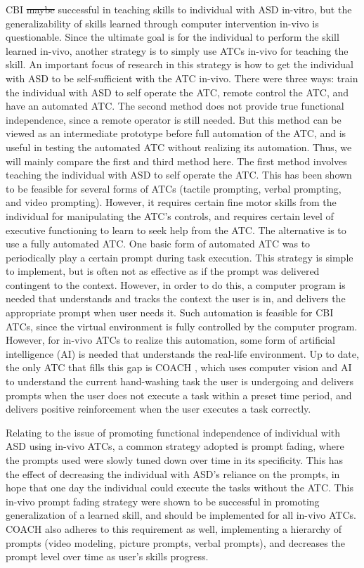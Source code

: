 \documentclass{ut-thesis}
\providecommand{\DIFaddtex}[1]{{\protect\color{blue}\uwave{#1}}} %
\providecommand{\DIFdeltex}[1]{{\protect\color{red}\sout{#1}}}                      %
\providecommand{\DIFaddbegin}{} %
\providecommand{\DIFaddend}{} %
\providecommand{\DIFdelbegin}{} %
\providecommand{\DIFdelend}{} %
\providecommand{\DIFadd}[1]{\texorpdfstring{\DIFaddtex{#1}}{#1}} %
\providecommand{\DIFdel}[1]{\texorpdfstring{\DIFdeltex{#1}}{}} %
\begin{document}
CBI \DIFdelbegin \DIFdel{maybe }\DIFdelend \DIFaddbegin \DIFadd{may be }\DIFaddend successful in teaching skills to individual with ASD in-vitro,  but the generalizability of skills learned through computer intervention in-vivo is questionable.  Since the ultimate goal is for the individual to perform the skill learned in-vivo, another strategy is to simply use ATCs in-vivo for teaching the skill.  An important focus of research in this strategy is how to get the individual with ASD to be self-sufficient with the ATC in-vivo.  There were three ways: train the individual with ASD to self operate the ATC, remote control the ATC, and have an automated ATC.  The second method does not provide true functional independence, since a remote operator is still needed.  But this method can be viewed as an intermediate prototype before full automation of the ATC, and is useful in testing the automated ATC without realizing its automation.  Thus, we will mainly compare the first and third method here.  The first method involves teaching the individual with ASD to self operate the ATC.  This has been shown to be feasible for several forms of ATCs (tactile prompting, verbal prompting, and video prompting).  However, it requires certain fine motor skills from the individual for manipulating the ATC's controls, and requires certain level of executive functioning to learn to seek help from the ATC.  The alternative is to use a fully automated ATC.  One basic form of automated ATC was to periodically play a certain prompt during task execution.  This strategy is simple to implement, but is often not as effective as if the prompt was delivered contingent to the context.  However, in order to do this, a computer program is needed that understands and tracks the context the user is in, and delivers the appropriate prompt when user needs it.  Such automation is feasible for CBI ATCs, since the virtual environment is fully controlled by the computer program.  However, for in-vivo ATCs to realize this automation, some form of artificial intelligence (AI) is needed that understands the real-life environment.  Up to date, the only ATC that fills this gap is COACH \cite{bimbrahw2012investigating}, which uses computer vision and AI to understand the current hand-washing task the user is undergoing and delivers prompts when the user does not execute a task within a preset time period, and delivers positive reinforcement when the user executes a task correctly.

Relating to the issue of promoting functional independence of individual with ASD using in-vivo ATCs, a common strategy adopted is prompt fading, where the prompts used were slowly tuned down over time in its specificity.  This has the effect of decreasing the individual with ASD's reliance on the prompts, in hope that one day the individual could execute the tasks without the ATC.  This in-vivo prompt fading strategy were shown to be successful in promoting generalization of a learned skill, and should be implemented for all in-vivo ATCs.  COACH also adheres to this requirement as well, implementing a hierarchy of prompts (video modeling, picture prompts, verbal prompts), and decreases the prompt level over time as user's skills progress.
\end{document}
